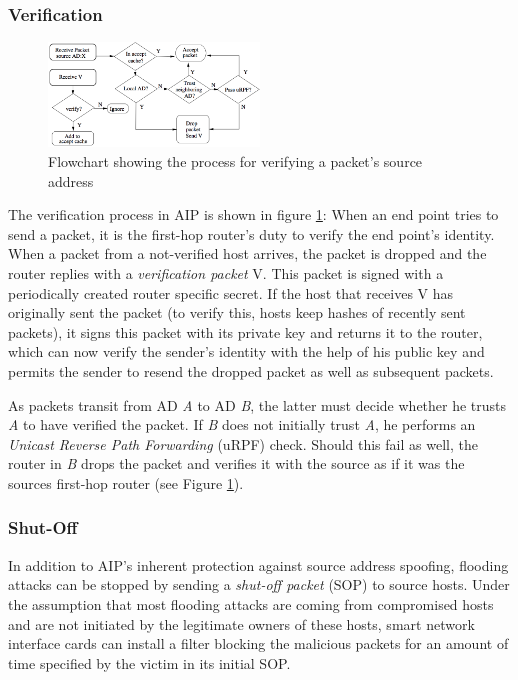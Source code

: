 \documentclass{acm_proc_article-sp}
\begin{document}
\subsubsection{Verification}
\begin{figure}[t]
  \includegraphics[width=0.5\textwidth]{images/aipflow.PNG}
  \caption{Flowchart showing the process for verifying a packet's source address \cite{aip}}
  \label{fig:aipflow}
\end{figure}
The verification process in AIP is shown in figure \ref{fig:aipflow}: When an end point tries to send a packet, it is the first-hop router's duty to verify the end point's identity. When a packet from a not-verified host arrives, the packet is dropped and the router replies with a \emph{verification packet} V. This packet is signed with a periodically created router specific secret. If the host that receives V has originally sent the packet (to verify this, hosts keep hashes of recently sent packets), it signs this packet with its private key and returns it to the router, which can now verify the sender's identity with the help of his public key and permits the sender to resend the dropped packet as well as subsequent packets.

As packets transit from AD \emph{A} to AD \emph{B}, the latter must decide whether he trusts \emph{A} to have verified the packet. If \emph{B} does not initially trust \emph{A}, he performs an \emph{Unicast Reverse Path Forwarding} (uRPF) check. Should this fail as well, the router in \emph{B} drops the packet and verifies it with the source as if it was the sources first-hop router (see Figure \ref{fig:aipflow}).

\subsubsection{Shut-Off}
In addition to AIP's inherent protection against source address spoofing, flooding attacks can be stopped by sending a \emph{shut-off packet} (SOP) to source hosts. Under the assumption that most flooding attacks are coming from compromised hosts and are not initiated by the legitimate owners of these hosts, smart network interface cards can install a filter blocking the malicious packets for an amount of time specified by the victim in its initial SOP.
\end{document}

